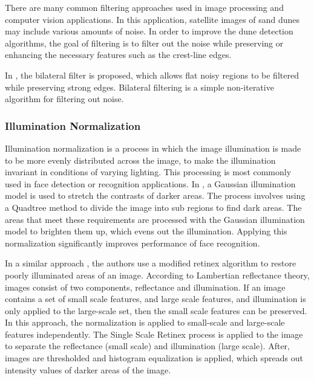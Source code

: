 There are many common filtering approaches used	in image processing and computer vision applications. In this application, satellite images of sand dunes may include various amounts of noise. In order to improve the dune detection algorithms, the goal of filtering is to filter out the noise while preserving or enhancing the necessary features such as the crest-line edges.

In \cite{Bilateral-filtering-gray-color-images}, the bilateral filter is proposed, which allows flat noisy regions	to be filtered while preserving strong edges. Bilateral filtering	is a simple non-iterative algorithm for filtering out noise.


\subsubsection{Illumination Normalization}

Illumination normalization is a process in which the image illumination is made to be more evenly distributed across the image, to make the illumination invariant in conditions of varying lighting. This processing is most commonly used in face detection or recognition applications. In \cite{Illumination_normalization_based_on_2d_gaussian_model}, a Gaussian illumination model is used to stretch the contrasts of darker areas. The process involves using a Quadtree method to divide the image into sub regions to find dark areas. The areas that meet these requirements are processed with the Gaussian illumination model to brighten them up, which evens out the illumination. Applying this normalization significantly improves performance of face recognition.

In a similar approach \cite{Illumination_normalization_for_image_restoration_using_modified_retinex_algorithm}, the authors use a modified retinex algorithm to restore poorly illuminated areas of an image. According to Lambertian reflectance theory, images consist of two components, reflectance and illumination. If an image contains a set of small scale features, and large scale features, and illumination is only applied to the large-scale set, then the small scale features can be preserved. In this approach, the normalization is applied to small-scale and large-scale features independently. The Single Scale Retinex process is applied to the image to separate	the reflectance (small scale) and illumination (large scale). After, images are thresholded and histogram equalization is applied, which spreads out intensity values of darker areas of the image.

